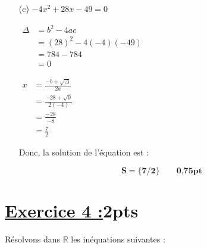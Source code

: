 \documentclass[12pt,a4paper]{article}
\begin{document}
\begin{enumerate}
    \item[(c)] \( -4x^2 + 28x - 49 = 0 \) 
    
\(
\begin{aligned}
\Delta &= b^2 - 4ac \\
       &= (28)^2 - 4(-4)(-49) \\
       &= 784 - 784 \\
       &= 0
\end{aligned}
\)

\(
\begin{aligned}
x &= \frac{-b + \sqrt{\Delta}}{2a} \\
  &= \frac{-28 + \sqrt{0}}{2(-4)} \\
  &= \frac{-28}{-8} \\
  &= \frac{7}{2}
\end{aligned}
\)

Donc, la solution de l'équation est :

\begin{tcolorbox}[colback=yellow!20, colframe=black, sharp corners]
    \[
    \mathbf{S = \{ 7/2 \}}\quad\quad \textbf{0,75pt}
    \]
\end{tcolorbox}

\end{enumerate}

\section*{\underline{Exercice 4 :}2pts}

Résolvons dans \( \mathbb{R} \) les inéquations suivantes :
\end{document}
